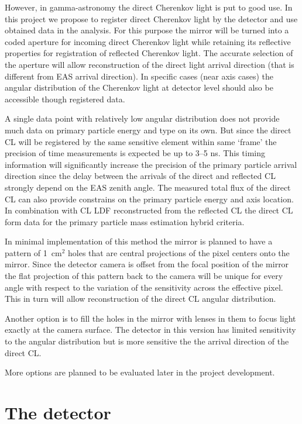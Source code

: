 \documentclass[a4paper,11pt]{article}
\begin{document}
However, in gamma-astronomy the direct Cherenkov light is put to good use. In this project we propose to register direct Cherenkov light by the detector and use obtained data in the analysis. For this purpose the mirror will be turned into a coded aperture for incoming direct Cherenkov light while retaining its reflective properties for registration of reflected Cherenkov light. The accurate selection of the aperture will allow reconstruction of the direct light arrival direction (that is different from EAS arrival direction). In specific cases (near axis cases) the angular distribution of the Cherenkov light at detector level should also be accessible though registered data.

A single data point with relatively low angular distribution does not provide much data on primary particle energy and type on its own. But since the direct CL will be registered by the same sensitive element within same `frame' the precision of time measurements is expected be up to 3--5 ns. This timing information will significantly increase the precision of the primary particle arrival direction since the delay between the arrivals of the direct and reflected CL strongly depend on the EAS zenith angle. The measured total flux of the direct CL can also provide constrains on the primary particle energy and axis location. In combination with CL LDF reconstructed from the reflected CL the direct CL form data for the primary particle mass estimation hybrid criteria.

In minimal implementation of this method the mirror is planned to have a pattern of 1~cm$^2$ holes that are central projections of the pixel centers onto the mirror. Since the detector camera is offset from the focal position of the mirror the flat projection of this pattern back to the camera will be unique for every angle with respect to the variation of the sensitivity across the effective pixel. This in turn will allow reconstruction of the direct CL angular distribution.

Another option is to fill the holes in the mirror with lenses in them to focus light exactly at the camera surface. The detector in this version has limited sensitivity to the angular distribution but is more sensitive the the arrival direction of the direct CL.

More options are planned to be evaluated later in the project development.

\section{The detector}
\end{document}
